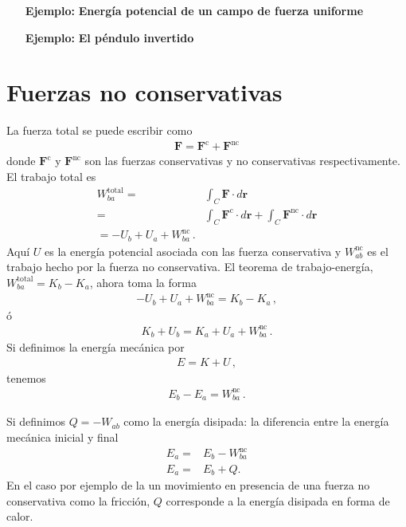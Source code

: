 \begin{inprogress}
  \begin{itemize}
  \item[\textbf{Ejemplo:}] \textbf{Energía potencial de un campo de fuerza uniforme}
  \end{itemize}
\end{inprogress}

\begin{inprogress}
  \begin{itemize}
  \item[\textbf{Ejemplo:}] \textbf{El péndulo invertido}
  \end{itemize}
\end{inprogress}


\section{Fuerzas no conservativas}
La fuerza total se puede escribir como
\begin{align}
  \mathbf{F}=\mathbf{F}^{\text{c}}+\mathbf{F}^{\text{nc}}
\end{align}
donde $\mathbf{F}^{\text{c}}$ y $\mathbf{F}^{\text{nc}}$ son las fuerzas conservativas y no conservativas respectivamente. El trabajo total es
\begin{align}
  W_{ba}^{\text{total}}=&\int_C \mathbf{F}\cdot d\mathbf{r}\nonumber\\
=&\int_C \mathbf{F}^{\text{c}}\cdot d\mathbf{r}+\int_C \mathbf{F}^{\text{nc}}\cdot d\mathbf{r}\nonumber\\
=-U_b+U_a+W_{ba}^{\text{nc}}\,.
\end{align}
Aquí $U$ es la energía potencial asociada con las fuerza conservativa y $W_{ab}^{\text{nc}}$ es el trabajo hecho por la fuerza no conservativa. El teorema de trabajo-energía, $W_{ba}^{\text{total}}=K_b-K_a$, ahora toma la forma
\begin{align}
  -U_b+U_a+W_{ba}^{\text{nc}}=K_b-K_a\,,
\end{align}
ó
\begin{align}
  K_b+U_b=K_a+U_a+W_{ba}^{\text{nc}}\,.
\end{align}
Si definimos la energía mecánica por
\begin{align}
  E=K+U\,,
\end{align}
tenemos
\begin{align}
  E_b-E_a=W_{ba}^{\text{nc}}\,.
\end{align}

Si definimos $Q=-W_{ab}$ como la energía disipada: la diferencia entre
la energía mecánica inicial y final
\begin{align}
  E_a=&E_b-W_{ba}^{\text{nc}}\nonumber\\
   E_a=&E_b+Q.
\end{align}
En el caso por ejemplo de la un movimiento en presencia de una fuerza
no conservativa como la fricción, $Q$ corresponde a la energía
disipada en forma de calor.

